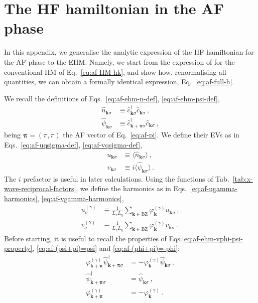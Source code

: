 \def\GraphicsFolder{chapters/antiferromagnetic-instability/pictures}
\chapter{The HF hamiltonian in the AF phase}\label{app:af-hf-hamiltonian}

In this appendix, we generalise the analytic expression of the HF hamiltonian for the AF phase to the EHM. Namely, we start from the expression of for the conventional HM of Eq.~\eqref{eq:af-HM-hk}, and show how, renormalising all quantities, we can obtain a formally identical expression, Eq.~\eqref{eq:af-full-h}.

We recall the definitions of Eqs.~\eqref{eq:af-ehm-n-def}, \eqref{eq:af-ehm-psi-def},
\begin{align}
	\hat n_{\mathbf{k}\sigma} &\equiv \hat c_{\mathbf{k}\sigma}^\dagger \hat c_{\mathbf{k}\sigma} \, , \label{appeq:af-ehm-n-def} \\
	\hat \psi_{\mathbf{k}\sigma} &\equiv \hat c_{\mathbf{k}+\bm{\pi}\sigma}^\dagger \hat c_{\mathbf{k}\sigma} \, , \label{appeq:af-ehm-psi-def}
\end{align}
being $\bm{\pi}=(\pi,\pi)$ the AF vector of Eq.~\eqref{eq:af-pi}. We define their EVs as in Eqs.~\eqref{eq:af-uqsigma-def}, \eqref{eq:af-vqsigma-def},
\begin{align}
	u_{\mathbf{k}\sigma} &\equiv \langle
	\hat n_{\mathbf{k}\sigma}
	\rangle \, , \label{appeq:af-uqsigma-def} \\
	v_{\mathbf{k}\sigma} &\equiv i \langle
	\hat \psi_{\mathbf{k}\sigma}
	\rangle \, . \label{appeq:af-vqsigma-def}
\end{align}
The $i$ prefactor is useful in later calculations. Using the functions of Tab.~\ref{tab:x-wave-reciprocal-factors}, we define the harmonics as in Eqs.~\eqref{eq:af-ugamma-harmonics}, \eqref{eq:af-vgamma-harmonics},
\begin{align}
	u^{(\gamma)}_\sigma &\equiv \frac{1}{L_x L_y} \sum_{\mathbf{k}\in\mathrm{BZ}} \varphi_\mathbf{k}^{(\gamma)} u_{\mathbf{k}\sigma} \, , \label{appeq:af-ugamma-harmonics} \\
	v^{(\gamma)}_\sigma &\equiv \frac{1}{L_x L_y} \sum_{\mathbf{k}\in\mathrm{BZ}} \varphi_\mathbf{k}^{(\gamma)} v_{\mathbf{k}\sigma} \, . \label{appeq:af-vgamma-harmonics}
\end{align}
Before starting, it is useful to recall the properties of Eqs.\eqref{eq:af-ehm-vphi-psi-property}, \eqref{eq:af-(psi+pi)=psi} and \eqref{eq:af-(phi+pi)=-phi}:
\begin{align}
	\varphi_{\mathbf{k}+\bm{\pi}}^{(\gamma)} \hat \psi_{\mathbf{k}+\bm{\pi}\sigma}^\dagger &= - \varphi_\mathbf{k}^{(\gamma)} \hat \psi_{\mathbf{k}\sigma} \, , \label{appeq:af-ehm-vphi-psi-property} \\
	\hat \psi_{\mathbf{k}+\bm{\pi}\sigma}^\dagger
	&= \hat \psi_{\mathbf{k}\sigma} \, , \label{appeq:af-(psi+pi)=psi} \\
	\varphi_{\mathbf{k}+\bm{\pi}}^{(\gamma)} &= -\varphi_\mathbf{k}^{(\gamma)} \, . \label{appeq:af-(phi+pi)=-phi}
\end{align}

